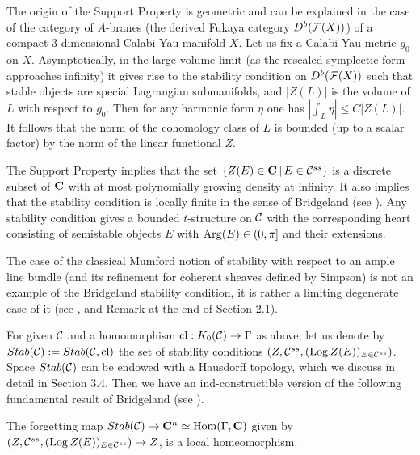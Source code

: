 \documentclass[12pt]{article}
\begin{document}
\begin{rmk} The origin of the Support Property is geometric and can be explained in the case of the category of $A$-branes (the derived Fukaya category $D^b({\cal F}(X))$)
of a compact $3$-dimensional Calabi-Yau manifold $X$. Let us fix a Calabi-Yau metric $g_0$ on $X$. Asymptotically, in the large volume limit (as the rescaled symplectic form approaches infinity) it gives rise
to the stability condition on $D^b({\cal F}(X))$ such that
stable objects are special Lagrangian submanifolds,
and $|Z(L)|$ is the volume of $L$ with respect to $g_0$. Then for any harmonic form $\eta$ one has
$|\int_{L}\eta|\le C|Z(L)|$. It follows that the norm of the cohomology class
of $L$ is bounded (up to a scalar factor) by the norm of the linear functional $Z$.
\end{rmk}





The Support Property implies that the set $\{Z(E)\in {\bf C}\,| \,E\in {\mathcal C}^{ss}\}$ is a discrete subset of ${\bf C}$ with at most polynomially
growing density at infinity. It also implies that the stability condition is locally finite in the sense of Bridgeland (see \cite{Br1}).
Any stability condition gives a bounded $t$-structure on ${\mathcal C}$ with the corresponding heart consisting of
  semistable objects $E$ with $\operatorname{Arg}(E) \in (0,\pi]$ and their extensions.

  \begin{rmk} The case of the classical Mumford notion of stability with respect to an ample
line bundle (and its refinement for coherent sheaves defined by Simpson) is not an example of the Bridgeland stability condition, it is rather
  a limiting degenerate case of it (see \cite{Ba}, \cite{Tod1} and Remark at the end of Section 2.1).

\end{rmk}

  For given ${\mathcal C}$ and a homomorphism  $\operatorname{cl}: K_0({\mathcal C})\to \Gamma$ as above, let us denote by $Stab({\mathcal C}):=Stab({\mathcal C},\operatorname{cl})$ the set of
stability conditions $(Z,{\mathcal C}^{ss}, (\operatorname{Log} Z(E))_{E\in {\mathcal C}^{ss}})$. Space $Stab({\mathcal C})$
 can be endowed with a  Hausdorff topology, which we discuss in detail in Section 3.4.
Then we have an ind-constructible version of
the following fundamental result of Bridgeland (see \cite{Br1}).

 \begin{thm}  The forgetting map $Stab({\mathcal C})\to {\bf C}^n\simeq { \operatorname{Hom}}(\Gamma,{\bf C})$ given by
  $( Z,{\mathcal C}^{ss}, (\operatorname{Log} Z(E))_{E\in {\mathcal C}^{ss}})\mapsto Z$,
 is a local homeomorphism.
 \end{thm}
\end{document}
